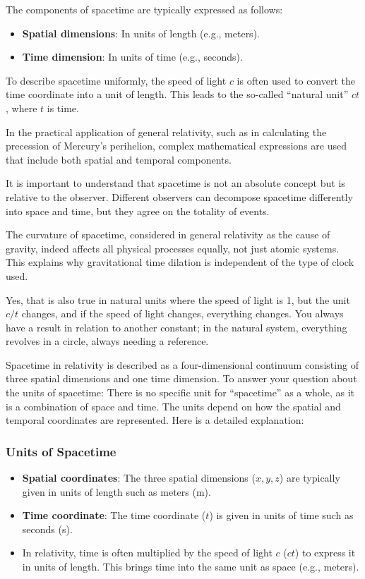 \documentclass[a4paper,12pt]{article}
\begin{document}
	The components of spacetime are typically expressed as follows:
	\begin{itemize}
		\item \textbf{Spatial dimensions}: In units of length (e.g., meters).
		\item \textbf{Time dimension}: In units of time (e.g., seconds).
	\end{itemize}
	To describe spacetime uniformly, the speed of light \( c \) is often used to convert the time coordinate into a unit of length. This leads to the so-called ``natural unit'' \( ct \), where \( t \) is time.
	
	In the practical application of general relativity, such as in calculating the precession of Mercury's perihelion, complex mathematical expressions are used that include both spatial and temporal components.
	
	It is important to understand that spacetime is not an absolute concept but is relative to the observer. Different observers can decompose spacetime differently into space and time, but they agree on the totality of events.
	
	The curvature of spacetime, considered in general relativity as the cause of gravity, indeed affects all physical processes equally, not just atomic systems. This explains why gravitational time dilation is independent of the type of clock used.
	
	Yes, that is also true in natural units where the speed of light is 1, but the unit \( c/t \) changes, and if the speed of light changes, everything changes. You always have a result in relation to another constant; in the natural system, everything revolves in a circle, always needing a reference.
	
	Spacetime in relativity is described as a four-dimensional continuum consisting of three spatial dimensions and one time dimension. To answer your question about the units of spacetime: There is no specific unit for ``spacetime'' as a whole, as it is a combination of space and time. The units depend on how the spatial and temporal coordinates are represented. Here is a detailed explanation:
	
	\subsubsection{Units of Spacetime}
	\begin{itemize}
		\item \textbf{Spatial coordinates}: The three spatial dimensions (\( x, y, z \)) are typically given in units of length such as meters (m).
		\item \textbf{Time coordinate}: The time coordinate (\( t \)) is given in units of time such as seconds (s).
		\item In relativity, time is often multiplied by the speed of light \( c \) (\( ct \)) to express it in units of length. This brings time into the same unit as space (e.g., meters).
	\end{itemize}
	
\end{document}
